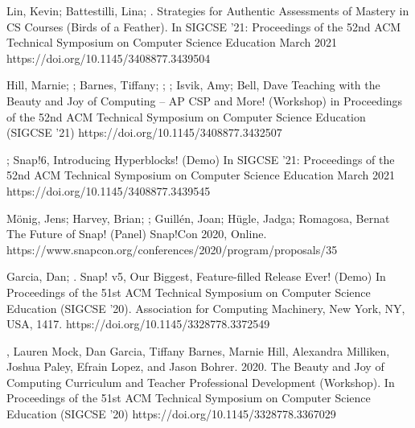 \begin{etaremune}
    \item{Lin, Kevin; Battestilli, Lina; \me. Strategies for Authentic Assessments of Mastery in CS Courses (Birds of a Feather). \newline In SIGCSE '21: Proceedings of the 52nd ACM Technical Symposium on Computer Science Education March 2021
    \newline
    https://doi.org/10.1145/3408877.3439504}
    
    \item{Hill, Marnie; \dan; Barnes, Tiffany; \lauren; \me; Isvik, Amy; Bell, Dave
    \newline Teaching with the Beauty and Joy of Computing – AP CSP and More! (Workshop)
    \newline in Proceedings of the 52nd ACM Technical Symposium on Computer Science Education (SIGCSE '21)
    \newline
    https://doi.org/10.1145/3408877.3432507}

    \item{\dan; \me
    \newline Snap!6, Introducing Hyperblocks! (Demo)
    \newline In SIGCSE '21: Proceedings of the 52nd ACM Technical Symposium on Computer Science Education March 2021
    \newline
    https://doi.org/10.1145/3408877.3439545}

    \item{Mönig, Jens; Harvey, Brian; \me;  Guillén, Joan; Hügle, Jadga; Romagosa, Bernat
    \newline
    The Future of Snap! (Panel)
    \newline Snap!Con 2020, Online.
    \newline
    https://www.snapcon.org/conferences/2020/program/proposals/35
    }
    
    \item{Garcia, Dan; \me.
    \newline
    Snap! v5, Our Biggest, Feature-filled Release Ever! (Demo)
    \newline 
    In Proceedings of the 51st ACM Technical Symposium on Computer Science Education (SIGCSE '20). Association for Computing Machinery, New York, NY, USA, 1417. 
    \newline
    https://doi.org/10.1145/3328778.3372549}
    
    \item{\me, Lauren Mock, Dan Garcia, Tiffany Barnes, Marnie Hill, Alexandra Milliken, Joshua Paley, Efrain Lopez, and Jason Bohrer. 2020. The Beauty and Joy of Computing Curriculum and Teacher Professional Development (Workshop). In Proceedings of the 51st ACM Technical Symposium on Computer Science Education (SIGCSE '20)
    \newline
    https://doi.org/10.1145/3328778.3367029}
    

\end{etaremune}
